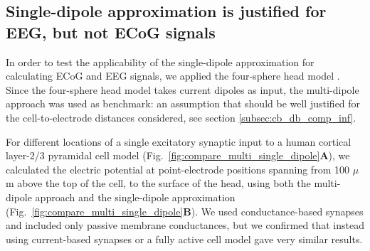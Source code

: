 \documentclass[preprint,10pt,authoryear]{elsarticle}
\begin{document}
\subsection{Single-dipole approximation is justified for EEG, but not ECoG signals}\label{subsec:cb_db_comp_4s}

In order to test the applicability of the single-dipole approximation for calculating ECoG and EEG signals, we applied the four-sphere head model \citep{NAESS2017, HAGEN2018, HAGEN2019}.
Since the four-sphere head model takes current dipoles as input, the multi-dipole approach was used as benchmark: an assumption that should be well justified for the cell-to-electrode distances considered, see section \ref{subsec:cb_db_comp_inf}.

For different locations of a single excitatory synaptic input to a human cortical layer-2/3 pyramidal cell model \citep{EYAL2016}
(Fig.~\ref{fig:compare_multi_single_dipole}\textbf{A}), we calculated the electric potential at point-electrode positions spanning from 100 $\mu$m above the top of the cell, to the surface of the head, using both the multi-dipole approach and the single-dipole approximation (Fig.~\ref{fig:compare_multi_single_dipole}\textbf{B}). 
We used conductance-based synapses and included only passive membrane conductances, but we confirmed that instead using current-based synapses or a fully active cell model gave very similar results.  
\end{document}
